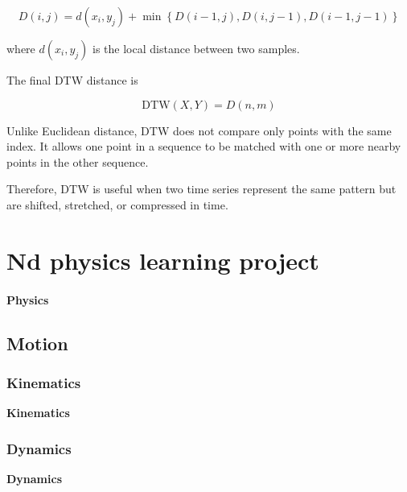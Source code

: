 \documentclass{book}
\providecommand{\ProjectDeepHeading}[2]{%
    \par\medskip\noindent\textbf{#2}\par\smallskip
}
\begin{document}
   \[
   D(i,j)
   =
   d(x_i,y_j)
   +
   \min
   \left\{
   D(i-1,j),
   D(i,j-1),
   D(i-1,j-1)
   \right\}
   \]

   where \(d(x_i,y_j)\) is the local distance between two samples.

   The final DTW distance is

   \[
   \mathrm{DTW}(X,Y)
   =
   D(n,m)
   \]

   Unlike Euclidean distance, DTW does not compare only points with the same index. It allows one point in a sequence to be matched with one or more nearby points in the other sequence.

   Therefore, DTW is useful when two time series represent the same pattern but are shifted, stretched, or compressed in time.

\chapter{Nd physics learning project}


\subsubsection{Physics}

\section{Motion}

\subsection{Kinematics}


\ProjectDeepHeading{1}{Kinematics}

\subsection{Dynamics}


\ProjectDeepHeading{1}{Dynamics}


    
\end{document}
